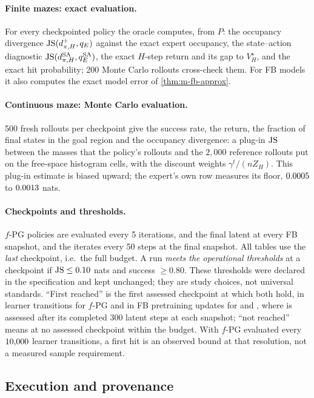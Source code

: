 \paragraph{Finite mazes: exact evaluation.}
For every checkpointed policy the oracle computes, from $P$: the occupancy divergence $\JS(d^+_{\pi,H},q_E)$ against the exact expert occupancy, the state--action diagnostic $\JS(d^{\SA}_{\pi,H},q^{\SA}_E)$, the exact $H$-step return and its gap to $V^\star_H$, and the exact hit probability; 200 Monte Carlo rollouts cross-check them. For FB models it also computes the exact model error of \cref{thm:m-fb-approx}.

\paragraph{Continuous maze: Monte Carlo evaluation.}
500 fresh rollouts per checkpoint give the success rate, the return, the fraction of final states in the goal region and the occupancy divergence: a plug-in $\JS$ between the masses that the policy's rollouts and the $2{,}000$ reference rollouts put on the  free-space histogram cells, with the discount weights $\gamma^t/(nZ_H)$. This plug-in estimate is biased upward; the expert's own row measures its floor, $\vn{s10.floor.lo}{0.0005}$ to $\vn{s10.floor.hi}{0.0013}$ nats.

\paragraph{Checkpoints and thresholds.}
$f$-PG policies are evaluated every 5 iterations, \ERFB{} and the final \DMFB{} latent at every FB snapshot, and the \DMFB{} iterates every 50 steps at the final snapshot. All tables use the \emph{last} checkpoint, i.e.\ the full budget.
A run \emph{meets the operational thresholds} at a checkpoint if $\JS\le0.10$ nats and success $\ge0.80$. These thresholds were declared in the specification and kept unchanged; they are study choices, not universal standards. ``First reached'' is the first assessed checkpoint at which both hold, in learner transitions for $f$-PG and in FB pretraining updates for \ERFB{} and \DMFB{}, where \DMFB{} is assessed after its completed 300 latent steps at each snapshot; ``not reached'' means at no assessed checkpoint within the budget.
With $f$-PG evaluated every $\vn{fpg.interval.f}{10{,}000}$ learner transitions, a first hit is an observed bound at that resolution, not a measured sample requirement.

\subsection{Execution and provenance}

